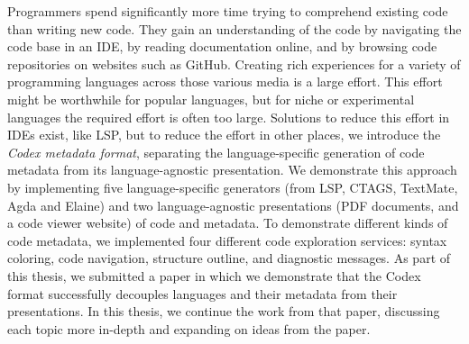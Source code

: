 
Programmers spend significantly more time trying to comprehend existing code than writing new code.
They gain an understanding of the code by navigating the code base in an IDE, by reading documentation online, and by browsing code repositories on websites such as GitHub.
Creating rich experiences for a variety of programming languages across those various media is a large effort.
This effort might be worthwhile for popular languages, but for niche or experimental languages the required effort is often too large.
Solutions to reduce this effort in IDEs exist, like LSP, but to reduce the effort in other places, we introduce the \emph{Codex metadata format}, separating the language-specific generation of code metadata from its language-agnostic presentation.
We demonstrate this approach by implementing five language-specific generators (from LSP, CTAGS, TextMate, Agda and Elaine) and two language-agnostic presentations (PDF documents, and a code viewer website) of code and metadata.
To demonstrate different kinds of code metadata, we implemented four different code exploration services: syntax coloring, code navigation, structure outline, and diagnostic messages.
As part of this thesis, we submitted a paper in which we demonstrate that the Codex format successfully decouples languages and their metadata from their presentations.
In this thesis, we continue the work from that paper, discussing each topic more in-depth and expanding on ideas from the paper.
